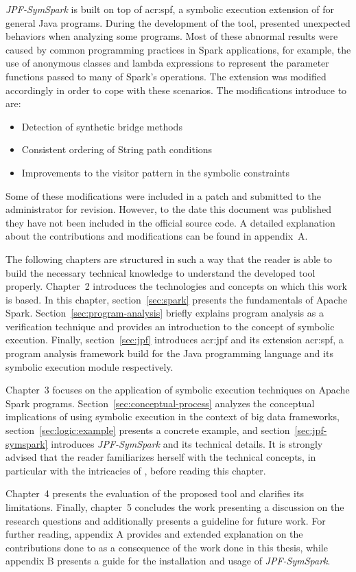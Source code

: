 \textit{JPF-SymSpark} is built on top of \acrfull{acr:spf}, a symbolic execution extension of \jpf{} for general Java programs. During the development of the tool, \spf{} presented unexpected behaviors when analyzing some programs. Most of these abnormal results were caused by common programming practices in Spark applications, for example, the use of anonymous classes and lambda expressions to represent the parameter functions passed to many of Spark's operations. The \spf{} extension was modified accordingly in order to cope with these scenarios. The modifications introduce to \spf{} are:

\begin{itemize}
	\item Detection of synthetic bridge methods
	\item Consistent ordering of String path conditions
	\item Improvements to the visitor pattern in the symbolic constraints
\end{itemize}

Some of these modifications were included in a patch and submitted to the \spf{} administrator for revision. However, to the date this document was published they have not been included in the official source code. A detailed explanation about the contributions and modifications can be found in appendix~A.


The following chapters are structured in such a way that the reader is able to build the necessary technical knowledge to understand the developed tool properly. Chapter~2 introduces the technologies and concepts on which this work is based. In this chapter, section~\ref{sec:spark} presents the fundamentals of Apache Spark. Section~\ref{sec:program-analysis} briefly explains program analysis as a verification technique and provides an introduction to the concept of symbolic execution. Finally, section~\ref{sec:jpf} introduces \acrlong{acr:jpf} and its extension \acrlong{acr:spf}, a program analysis framework build for the Java programming language and its symbolic execution module respectively.

Chapter~3 focuses on the application of symbolic execution techniques on Apache Spark programs. Section~\ref{sec:conceptual-process} analyzes the conceptual implications of using symbolic execution in the context of big data frameworks, section~\ref{sec:logic:example} presents a concrete example, and section~\ref{sec:jpf-symspark} introduces \textit{JPF-SymSpark} and its technical details. It is strongly advised that the reader familiarizes herself with the technical concepts, in particular with the intricacies of \jpf{}, before reading this chapter.

Chapter~4 presents the evaluation of the proposed tool and clarifies its limitations. Finally, chapter~5 concludes the work presenting a discussion on the research questions and additionally presents a guideline for future work. For further reading, appendix A provides and extended explanation on the contributions done to \spf{} as a consequence of the work done in this thesis, while appendix B presents a guide for the installation and usage of \textit{JPF-SymSpark}.

 
